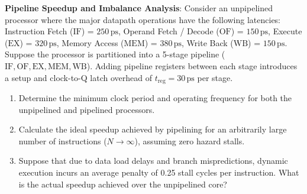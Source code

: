 \begin{problem}
\textbf{Pipeline Speedup and Imbalance Analysis}:
Consider an unpipelined processor where the major datapath operations have the following latencies:
Instruction Fetch ($\text{IF}$) = $250\,\text{ps}$,
Operand Fetch / Decode ($\text{OF}$) = $150\,\text{ps}$,
Execute ($\text{EX}$) = $320\,\text{ps}$,
Memory Access ($\text{MEM}$) = $380\,\text{ps}$,
Write Back ($\text{WB}$) = $150\,\text{ps}$.
Suppose the processor is partitioned into a 5-stage pipeline ($\text{IF}, \text{OF}, \text{EX}, \text{MEM}, \text{WB}$). Adding pipeline registers between each stage introduces a setup and clock-to-Q latch overhead of $t_{\text{reg}} = 30\,\text{ps}$ per stage.
\begin{enumerate}
    \item Determine the minimum clock period and operating frequency for both the unpipelined and pipelined processors.
    \item Calculate the ideal speedup achieved by pipelining for an arbitrarily large number of instructions ($N \to \infty$), assuming zero hazard stalls.
    \item Suppose that due to data load delays and branch mispredictions, dynamic execution incurs an average penalty of 0.25 stall cycles per instruction. What is the actual speedup achieved over the unpipelined core?
\end{enumerate}


\end{problem}
